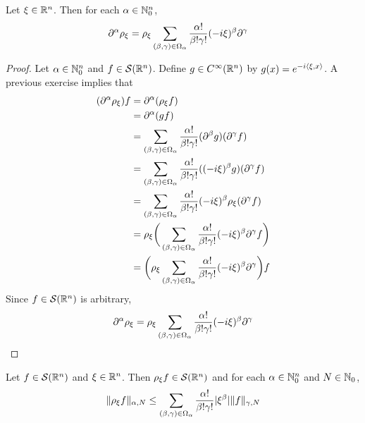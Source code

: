 \documentclass{book}
\begin{document}
	\begin{ex}
		Let $\xi \in \mathbb{R}^n$. Then for each $\alpha \in \mathbb{N}_0^n$,  
		\begin{align*}
			\partial^{\alpha} \rho_{\xi}
			& =   \rho_{\xi}  \sum_{(\beta, \gamma) \in \Omega_{\alpha}} \frac{\alpha!}{\beta! \gamma!} (-i \xi)^{\beta}  \partial^{\gamma} 
		\end{align*}
	\end{ex}
	
	\begin{proof}
		Let $\alpha \in \mathbb{N}_0^n$ and $f \in \mathcal{S}(\mathbb{R}^n)$. Define $g \in C^{\infty}(\mathbb{R}^n)$ by $g(x) = e^{-i \langle \xi, x \rangle}$. A previous exercise implies that 
		\begin{align*}
			(\partial^{\alpha} \rho_{\xi})f
			& = \partial^{\alpha} (\rho_{\xi} f) \\
			& = \partial^{\alpha} (gf) \\
			& = \sum_{(\beta, \gamma) \in \Omega_{\alpha}} \frac{\alpha!}{\beta! \gamma!}( \partial^{\beta} g) (\partial^{\gamma} f) \\
			& = \sum_{(\beta, \gamma) \in \Omega_{\alpha}} \frac{\alpha!}{\beta! \gamma!}((-i \xi)^{\beta} g) (\partial^{\gamma} f) \\
			& = \sum_{(\beta, \gamma) \in \Omega_{\alpha}} \frac{\alpha!}{\beta! \gamma!} (-i \xi)^{\beta} \rho_{\xi}( \partial^{\gamma} f) \\
			& = \rho_{\xi} \bigg( \sum_{(\beta, \gamma) \in \Omega_{\alpha}} \frac{\alpha!}{\beta! \gamma!} (-i \xi)^{\beta}  \partial^{\gamma} f \bigg ) \\
			& = \bigg( \rho_{\xi}  \sum_{(\beta, \gamma) \in \Omega_{\alpha}} \frac{\alpha!}{\beta! \gamma!} (-i \xi)^{\beta}  \partial^{\gamma}  \bigg) f
		\end{align*}
		Since $f \in \mathcal{S}(\mathbb{R}^n)$ is arbitrary, 
		$$\partial^{\alpha} \rho_{\xi} = \rho_{\xi}  \sum_{(\beta, \gamma) \in \Omega_{\alpha}} \frac{\alpha!}{\beta! \gamma!} (-i \xi)^{\beta}  \partial^{\gamma} $$
	\end{proof}

	\begin{ex}
		Let $f \in \mathcal{S}(\mathbb{R}^n)$ and $\xi \in \mathbb{R}^n$. Then $\rho_{\xi} f \in \mathcal{S}(\mathbb{R}^n)$ and for each $\alpha \in \mathbb{N}_0^n$ and $N \in \mathbb{N}_0$, 
		$$\|\rho_{\xi}f\|_{\alpha, N} \leq \sum_{(\beta, \gamma) \in \Omega_{\alpha}} \frac{\alpha!}{\beta! \gamma!} |\xi^{\beta}|  \|f\|_{\gamma, N}$$
	\end{ex}
	
\end{document}
